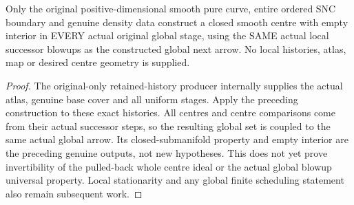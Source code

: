 \begin{theorem}
\label{hir:sharp-actual-curve-original-global-successor-centre}
\leanok
Only the original positive-dimensional smooth pure curve, entire ordered
SNC boundary and genuine density data construct a closed smooth centre
with empty interior in EVERY actual original global stage, using the SAME
actual local successor blowups as the constructed global next arrow.
No local histories, atlas, map or desired centre geometry is supplied.
\end{theorem}
\begin{proof}
The original-only retained-history producer internally supplies the actual
atlas, genuine base cover and all uniform stages. Apply the preceding
construction to these exact histories. All centres and centre comparisons
come from their actual successor steps, so the resulting global set is
coupled to the same actual global arrow. Its closed-submanifold property
and empty interior are the preceding genuine outputs, not new hypotheses.
This does not yet prove invertibility of the pulled-back whole centre
ideal or the actual global blowup universal property. Local stationarity
and any global finite scheduling statement also remain subsequent work.
\end{proof}

